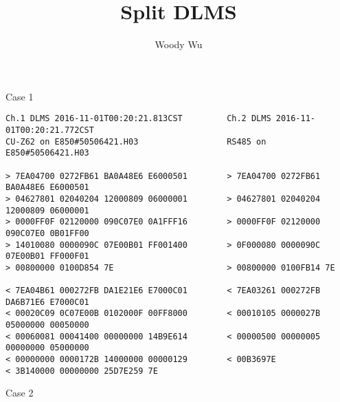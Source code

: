 \documentclass[11pt,a4paper]{article}
\title{Split DLMS}
\author{Woody Wu}
\begin{document}
\maketitle


\large{Case 1}

\lstset{escapechar=@,style=datagram}
\begin{lstlisting}
Ch.1 DLMS 2016-11-01T00:20:21.813CST         Ch.2 DLMS 2016-11-01T00:20:21.772CST
CU-Z62 on E850#50506421.H03                  RS485 on E850#50506421.H03
                                             
> 7EA04700 0272FB61 BA0A48E6 E6000501        > 7EA04700 0272FB61 BA0A48E6 E6000501
> 04627801 02040204 12000809 06000001        > 04627801 02040204 12000809 06000001
> 0000FF0F 02120000 090C07E0 0A1FFF16        > 0000FF0F 02120000 090C07E0 0B01FF00
> 14010080 0000090C 07E00B01 FF001400        > 0F000080 0000090C 07E00B01 FF000F01
> 00800000 0100D854 7E                       > 00800000 0100FB14 7E               
                                             
< 7EA04B61 000272FB DA1E21E6 E7000C01        < 7EA03261 000272FB DA6B71E6 E7000C01
< 00020C09 0C07E00B 0102000F 00FF8000        < 00010105 0000027B 05000000 00050000
< 00060081 00041400 00000000 14B9E614        < 00000500 00000005 00000000 05000000
< 00000000 0000172B 14000000 00000129        < 00B3697E                           
< 3B140000 00000000 25D7E259 7E
\end{lstlisting}

\large{Case 2}
\end{document}
